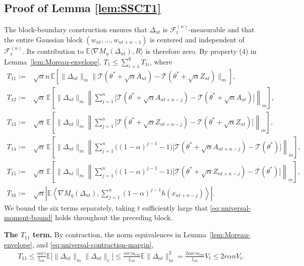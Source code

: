 \documentclass[11pt,letterpaper]{article}
\theoremstyle{plain}
\theoremstyle{definition}
\theoremstyle{remark}
\newcommand{\E}{\mathbb{E}}
\newcommand{\mT}{\mathcal{T}}
\begin{document}
\subsection{Proof of Lemma \ref{lem:SSCT1}}\label{sec:problemT1}
The block-boundary construction ensures that \(\Delta_{nt}\) is
\(\mathcal F_t^{(n)}\)-measurable and that the entire Gaussian block
\((w_{nt},\ldots,w_{nt+n-1})\) is centered and independent of
\(\mathcal F_t^{(n)}\). Its contribution to
\(\E\langle\nabla M_\eta(\Delta_{nt}),R\rangle\) is therefore zero.
By property (4) in Lemma~\ref{lem:Moreau-envelope},
\(T_1\leq\sum_{i=1}^6T_{1i}\), where
\begin{align*}
T_{11}:={}&\sqrt\alpha n\,
    \E\!\left[\|\Delta_{nt}\|_m
        \bigl\|\mT(\theta^*+\sqrt\alpha A_{nt})
               -\mT(\theta^*+\sqrt\alpha Z_{nt})\bigr\|_m\right],\\
T_{12}:={}&\sqrt\alpha\,
    \E\!\left[\|\Delta_{nt}\|_m
        \left\|\sum_{j=1}^n
            \bigl[\mT(\theta^*+\sqrt\alpha A_{nt+n-j})
                  -\mT(\theta^*+\sqrt\alpha A_{nt})\bigr]
        \right\|_m\right],\\
T_{13}:={}&\sqrt\alpha\,
    \E\!\left[\|\Delta_{nt}\|_m
        \left\|\sum_{j=1}^n
            \bigl[\mT(\theta^*+\sqrt\alpha Z_{nt+n-j})
                  -\mT(\theta^*+\sqrt\alpha Z_{nt})\bigr]
        \right\|_m\right],\\
T_{14}:={}&\sqrt\alpha\,
    \E\!\left[\|\Delta_{nt}\|_m
        \left\|\sum_{j=1}^n\bigl((1-\alpha)^{j-1}-1\bigr)
            \bigl[\mT(\theta^*+\sqrt\alpha A_{nt+n-j})-\mT(\theta^*)\bigr]
        \right\|_m\right],\\
T_{15}:={}&\sqrt\alpha\,
    \E\!\left[\|\Delta_{nt}\|_m
        \left\|\sum_{j=1}^n\bigl((1-\alpha)^{j-1}-1\bigr)
            \bigl[\mT(\theta^*+\sqrt\alpha Z_{nt+n-j})-\mT(\theta^*)\bigr]
        \right\|_m\right],\\
T_{16}:={}&\sqrt\alpha\left|
    \E\left\langle\nabla M_\eta(\Delta_{nt}),
        \sum_{j=1}^n(1-\alpha)^{j-1}h(x_{nt+n-j})
    \right\rangle\right|.
\end{align*}
We bound the six terms separately, taking \(t\) sufficiently large that
\eqref{eq:universal-moment-bound} holds throughout the preceding block.

\noindent\textbf{The \(T_{11}\) term.}
By contraction, the norm equivalences in
Lemma~\ref{lem:Moreau-envelope}, and
\eqref{eq:universal-contraction-margin},
\begin{align*}
    T_{11}
    \leq\frac{\alpha n\gamma}{l_{cm}}
        \E\bigl[\|\Delta_{nt}\|_m\|\Delta_{nt}\|_c\bigr]\leq\frac{\alpha n\gamma u_{cm}}{l_{cm}}
        \E\|\Delta_{nt}\|_m^2
    =\frac{2\alpha n\gamma u_{cm}}{l_{cm}}V_t
    \leq2r\alpha nV_t.
\end{align*}
\end{document}
